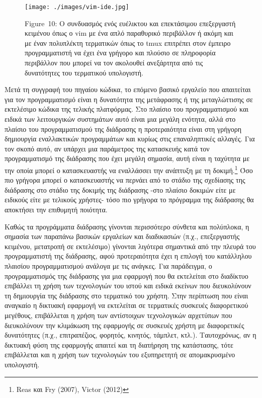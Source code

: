 \documentclass[
]{article}
\begin{document}
\leavevmode{}%
\begin{figure}
\hypertarget{fig:vim-ide}{%
\centering
\texttt{[image: ./images/vim-ide.jpg]}
\caption{Figure~10: Ο συνδυασμός ενός ευέλικτου και επεκτάσιμου
επεξεργαστή κειμένου όπως ο vim με ένα απλό παραθυρικό περιβάλλον ή
ακόμη και με έναν πολυπλέκτη τερματικών όπως το tmux επιτρέπει στον
έμπειρο προγραμματιστή να έχει ένα γρήγορο και πλούσιο σε πληροφορία
περιβάλλον που μπορεί να τον ακολουθεί ανεξάρτητα από τις δυνατότητες
του τερματικού υπολογιστή.}\label{fig:vim-ide}
}
\end{figure}

Μετά τη συγγραφή του πηγαίου κώδικα, το επόμενο βασικό εργαλείο που
απαιτείται για τον προγραμματισμό είναι η δυνατότητα της μετάφρασης ή
της μεταγλώττισης σε εκτελέσιμο κώδικα της τελικής πλατφόρμας. Στο
πλαίσιο του προγραμματισμού και ειδικά των λειτουργικών συστημάτων αυτό
είναι μια μεγάλη ενότητα, αλλά στο πλαίσιο του προγραμματισμού της
διάδρασης η προτεραιότητα είναι στη γρήγορη δημιουργία εναλλακτικών
προγραμμάτων και κυρίως στις επαναληπτικές αλλαγές. Για τον σκοπό αυτό,
αν υπάρχει μια παράμετρος της κατασκευής κατά τον προγραμματισμό της
διάδρασης που έχει μεγάλη σημασία, αυτή είναι η ταχύτητα με την οποία
μπορεί ο κατασκευαστής να εναλλάσσει την ανάπτυξη με τη
δοκιμή.\footnote{Reas και Fry (2007), Victor (2012)} Όσο πιο γρήγορα
μπορεί ο κατασκευαστής να περνάει από το στάδιο της σχεδίασης της
διάδρασης στο στάδιο της δοκιμής της διάδρασης -στο πλαίσιο δοκιμών είτε
με ειδικούς είτε με τελικούς χρήστες- τόσο πιο γρήγορα το πρόγραμμα της
διάδρασης θα αποκτήσει την επιθυμητή ποιότητα.

Καθώς τα προγράμματα διάδρασης γίνονται περισσότερο σύνθετα και
πολύπλοκα, η σημασία των παραπάνω βασικών εργαλείων και διαδικασιών
(π.χ., επεξεργαστής κειμένου, μετατροπή σε εκτελέσιμο) γίνονται λιγότερα
σημαντικά από την πλευρά του προγραμματιστή της διάδρασης, αφού
προτεραιότητα έχει η επιλογή του κατάλληλου πλαισίου προγραμματισμού
ανάλογα με τις ανάγκες. Για παράδειγμα, ο προγραμματισμός της διάδρασης
για μια εφαρμογή που θα εκτελείται στο διαδίκτυο επιβάλλει τη χρήση των
τεχνολογιών του ιστού και ειδικά εκείνων που διευκολύνουν τη δημιουργία
της διάδρασης στο τερματικό του χρήστη. Στην περίπτωση που είναι
αναγκαίο η δικτυακή εφαρμογή να εκτελείται σε τερματικές συσκευές
διαφορετικού μεγέθους, επιβάλλεται η χρήση των αντίστοιχων τεχνολογικών
αρχετύπων που διευκολύνουν την κλιμάκωση της εφαρμογής σε συσκευές
χρήστη με διαφορετικές δυνατότητες (π.χ., επιτραπέζιος, φορητός,
κινητός, τάμπλετ, κτλ.). Ταυτοχρόνως, αν η δικτυακή φύση της εφαρμογής
απαιτεί και τη διατήρηση της κατάστασης, τότε επιβάλλεται και η χρήση
των τεχνολογιών του εξυπηρετητή σε απομακρυσμένο υπολογιστή.
\end{document}
